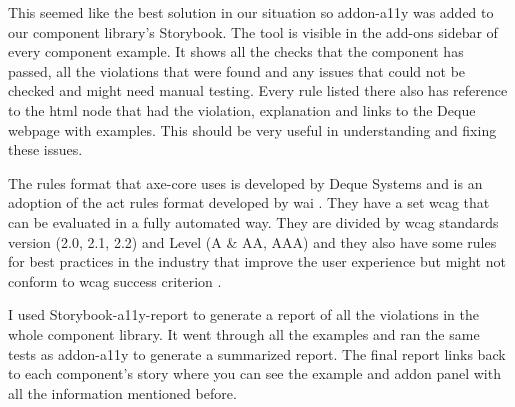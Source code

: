 \documentclass{master_thesis}
\begin{document}
This seemed like the best solution in our situation so addon-a11y was added to our component library’s Storybook. The tool is visible in the add-ons sidebar of every component example. It shows all the checks that the component has passed, all the violations that were found and any issues that could not be checked and might need manual testing. Every rule listed there also has reference to the \ac{html} node that had the violation, explanation and links to the Deque webpage with examples. This should be very useful in understanding and fixing these issues.

The rules format that axe-core uses is developed by Deque Systems and is an adoption of the \ac{act} rules format developed by \ac{wai} \citep{Fiers2017}. They have a set \ac{wcag} that can be evaluated in a fully automated way. They are divided by \ac{wcag} standards version (2.0, 2.1, 2.2) and Level (A \& AA, AAA) and they also have some rules for best practices in the industry that improve the user experience but might not conform to \ac{wcag} success criterion \citep{Fiers2023}.

I used Storybook-a11y-report \citep{Karube2020} to generate a report of all the violations in the whole component library. It went through all the examples and ran the same tests as addon-a11y to generate a summarized report. The final report links back to each component's story where you can see the example and addon panel with all the information mentioned before. 
\end{document}
